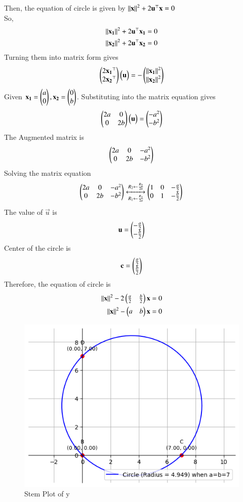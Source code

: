 \documentclass[journal]{IEEEtran}
\begin{document}
Then, the equation of circle is given by $ \left\lVert\mathbf{x}\right\rVert^{2}+2\mathbf{u}^\top\mathbf{x}=0 $ \\
So,
\begin{align}
 \left\lVert\mathbf{x_{1}}\right\rVert^{2}+2\mathbf{u}^\top\mathbf{x_{1}}=0  \\
 \left\lVert\mathbf{x_{2}}\right\rVert^{2}+2\mathbf{u}^\top\mathbf{x_{2}}=0  
\end{align}
Turning them into matrix form gives
\begin{align}
 \begin{pmatrix}2\mathbf{x_{1}}^\top \\ 2\mathbf{x_{2}}^\top \end{pmatrix}\begin{pmatrix}\mathbf{u}\end{pmatrix} = -\begin{pmatrix}\left\lVert\mathbf{x_{1}}\right\rVert^{2} \\ \left\lVert\mathbf{x_{2}}\right\rVert^{2}\end{pmatrix}
 \end{align}
 Given $\mathbf{x_{1}} = \begin{pmatrix}a \\ 0\end{pmatrix}, \mathbf{x_{2}} = \begin{pmatrix}0 \\ b\end{pmatrix}$. Substituting into the matrix equation gives 
 \begin{align}
     \begin{pmatrix}2a & 0 \\ 0 & 2b\end{pmatrix}\begin{pmatrix}\mathbf{u}\end{pmatrix} = \begin{pmatrix}-a^{2} \\ -b^{2}\end{pmatrix}
 \end{align}
 The Augmented matrix is 
 \begin{align}
     \begin{pmatrix}2a & 0 & -a^{2} \\ 0 & 2b & -b^{2}\end{pmatrix}
 \end{align}
 Solving the matrix equation 
 \begin{align}
     \begin{pmatrix}2a & 0 & -a^{2} \\ 0 & 2b & -b^{2}\end{pmatrix}\xleftrightarrow[R_{1}\leftarrow \frac{R_{1}}{2a}]{R_{2}\leftarrow \frac{R_{2}}{2b}} \begin{pmatrix}1 & 0 & -\frac{a}{2} \\ 0 & 1 & -\frac{b}{2}\end{pmatrix}
 \end{align}
 The value of $\vec{u}$ is 
 \begin{align}
     \mathbf{u}=\begin{pmatrix}-\frac{a}{2} \\ -\frac{b}{2}\end{pmatrix}
 \end{align}
 Center of the circle is
 \begin{align}
     \mathbf{c}=\begin{pmatrix}\frac{a}{2} \\ \frac{b}{2}\end{pmatrix}
 \end{align}
 Therefore, the equation of circle is 
 \begin{align}
      \left\lVert\mathbf{x}\right\rVert^{2}-2\begin{pmatrix}\frac{a}{2} & \frac{b}{2}\end{pmatrix}\mathbf{x}=0  \\
          \left\lVert\mathbf{x}\right\rVert^{2}-\begin{pmatrix}a & b\end{pmatrix}\mathbf{x}=0
      \end{align}
      \begin{figure}[h!]
   \centering
   \includegraphics[width=0.7\linewidth]{figs/plot.png}
   \caption{Stem Plot of y}
   \label{stemplot}
\end{figure}
\end{document}
